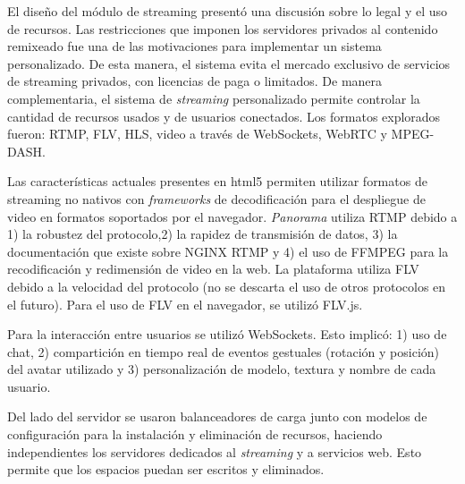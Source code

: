 El diseño del módulo de streaming presentó una discusión sobre lo legal y el uso de recursos. Las restricciones que imponen los servidores privados al contenido remixeado fue una de las motivaciones para implementar un sistema personalizado. De esta manera, el sistema evita el mercado exclusivo de servicios de streaming privados, con licencias de paga o limitados. De manera complementaria, el sistema de \textit{streaming} personalizado permite controlar la cantidad de recursos usados y  de usuarios conectados. Los formatos explorados fueron: RTMP, FLV, HLS, video a través de WebSockets, WebRTC y MPEG-DASH.

Las características actuales presentes en html5 permiten utilizar formatos de streaming no nativos con \textit{frameworks} de decodificación para el despliegue de video en formatos soportados por el navegador. \textit{Panorama} utiliza RTMP debido a 1) la robustez del protocolo,2) la rapidez de transmisión de datos, 3) la documentación que existe sobre NGINX RTMP y 4) el uso de FFMPEG para la recodificación y redimensión de video en la web. La plataforma utiliza FLV debido a la velocidad del protocolo (no se descarta el uso de otros protocolos en el futuro). Para el uso de FLV en el navegador, se utilizó FLV.js. 

Para la interacción entre usuarios se utilizó WebSockets. Esto implicó: 1) uso de chat, 2) compartición en tiempo real de eventos gestuales (rotación y posición) del avatar utilizado y 3) personalización de modelo, textura y nombre de cada usuario. 

Del lado del servidor  se usaron balanceadores de carga junto con modelos de configuración para la instalación y eliminación de recursos, haciendo independientes los servidores dedicados al \textit{streaming} y a servicios web. Esto permite que los espacios puedan ser escritos y eliminados.
